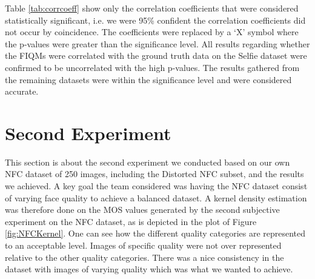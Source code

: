 \begin{table}[h]
\caption{All correlation coefficients on the three datasets between ISO Metrics, FaceQnet, FIQMs Combined and the ground truth data. The `X'-symbol indicated the correlation coefficients that had a p-value higher than 0.05 and were therefore ignored. The coefficients were not calculated where the `-' symbol is placed.}
\label{tab:corrcoeff}
\end{table}
\noindent
Table \ref{tab:corrcoeff} show only the correlation coefficients that were considered statistically significant, i.e. we were 95\% confident the correlation coefficients did not occur by coincidence. The coefficients were replaced by a `X' symbol where the p-values were greater than the significance level. All results regarding whether the FIQMs were correlated with the ground truth data on the Selfie dataset were confirmed to be uncorrelated with the high p-values. The results gathered from the remaining datasets were within the significance level and were considered accurate.  


\section{Second Experiment}
This section is about the second experiment we conducted based on our own NFC dataset of 250 images, including the Distorted NFC subset, and the results we achieved. A key goal the team considered was having the NFC dataset consist of varying face quality to achieve a balanced dataset. A kernel density estimation was therefore done on the MOS values generated by the second subjective experiment on the NFC dataset, as is depicted in the plot of Figure \ref{fig:NFCKernel}. One can see how the different quality categories are represented to an acceptable level. Images of specific quality were not over represented relative to the other quality categories. There was a nice consistency in the dataset with images of varying quality which was what we wanted to achieve. 
\newpage

